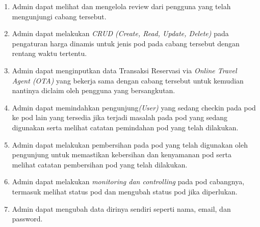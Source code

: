 \begin{enumerate}
\begin{enumerate}
              \item Admin dapat melihat dan mengelola review dari pengguna yang telah mengunjungi cabang tersebut.
              \item Admin dapat melakukan \textit{CRUD (Create, Read, Update, Delete)} pada pengaturan harga dinamis untuk jenis pod pada cabang tersebut dengan rentang waktu tertentu.
              \item Admin dapat menginputkan data Transaksi Reservasi via \textit{Online Travel Agent (OTA)} yang bekerja sama dengan cabang tersebut untuk kemudian nantinya diclaim oleh pengguna yang bersangkutan.
              \item Admin dapat memindahkan pengunjung\textit{(User)} yang sedang checkin pada pod ke pod lain yang tersedia jika terjadi masalah pada pod yang sedang digunakan serta melihat catatan pemindahan pod yang telah dilakukan.
              \item Admin dapat melakukan pembersihan pada pod yang telah digunakan oleh pengunjung untuk memastikan kebersihan dan kenyamanan pod serta melihat catatan pembersihan pod yang telah dilakukan.
              \item Admin dapat melakukan \textit{{monitoring dan controlling}} pada pod cabangnya, termasuk melihat status pod dan mengubah status pod jika diperlukan.
              \item Admin dapat mengubah data dirinya sendiri seperti nama, email, dan password.
          \end{enumerate}


\end{enumerate}
